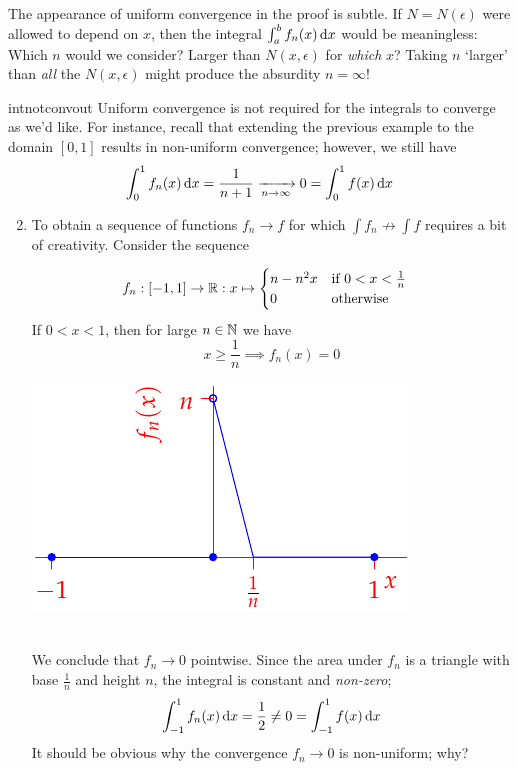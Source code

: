 The appearance of uniform convergence in the proof is subtle. If $N=N(\epsilon)$ were allowed to depend on $x$, then the integral $\int_a^bf_n(x)\,{\mathrm{d} x}$ would be meaningless: Which $n$ would we consider? Larger than $N(x,\epsilon)$ for \emph{which} $x$? Taking $n$ `larger' than \emph{all} the $N(x,\epsilon)$ might produce the absurdity $n=\infty$!\goodbreak

\begin{examples}{}{intnotconvout}
\exstart Uniform convergence is not required for the integrals to converge as we'd like. For instance, recall that extending the previous example to the domain $[0,1]$ results in non-uniform convergence; however, we still have
	\[\int_0^1f_n(x)\,{\mathrm{d} x}=\frac 1{n+1}\xrightarrow[n\to\infty]{} 0 =\int_0^1f(x)\,{\mathrm{d} x}\]
  
\begin{enumerate}\setcounter{enumi}{1}
  \item\label{ex:intnotconv} To obtain a sequence of functions $f_n\to f$ for which $\int f_n\nrightarrow\int f$ requires a bit of creativity. Consider the sequence\smallbreak
  \begin{minipage}[t]{0.6\linewidth}\vspace{-15pt}
  \begin{align*}
  f_n&:[-1,1]\to\mathbb{R} :x\mapsto \begin{cases}
  n-n^2x&\text{if }0<x<\frac 1n\\
  0&\text{otherwise}
  \end{cases}
  \end{align*}
  If $0<x<1$, then for large $n\in\mathbb{N}$ we have
  \[x\ge\frac 1n\implies f_n(x)=0\]
  \end{minipage}\begin{minipage}[t]{0.4\linewidth}\vspace{-10pt}
  \flushright\includegraphics{seqex10}
  \end{minipage}\\[0pt]
  We conclude that $f_n\to 0$ pointwise. Since the area under $f_n$ is a triangle with base $\frac 1n$ and height $n$, the integral is constant and \emph{non-zero};
  \[\int_{-1}^1 f_n(x)\,{\mathrm{d} x}=\frac 12\neq 0=\int_{-1}^1f(x)\,{\mathrm{d} x}\]
  It should be obvious why the convergence $f_n\to 0$ is non-uniform; why?
\end{enumerate}
\end{examples}


